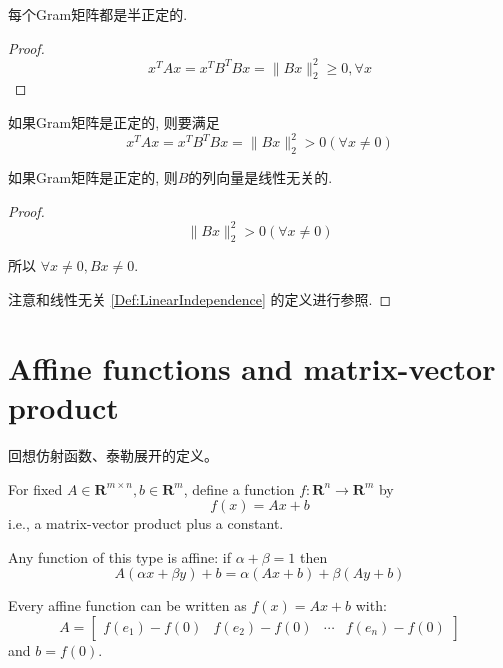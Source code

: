 \begin{theorem}
    每个Gram矩阵都是半正定的.
\end{theorem}

\begin{proof}
    $$ x^{T} A x=x^{T} B^{T} B x=\|B x\|_{2}^{2} \geq 0 , \forall x $$
\end{proof}

\begin{theorem}
    如果Gram矩阵是正定的, 则要满足
    $$ x^{T} A x=x^{T} B^{T} B x=\|B x\|_{2}^{2}>0 ( \forall x \neq 0) $$
\end{theorem}

\begin{corollary}
    如果Gram矩阵是正定的, 则$B$的列向量是线性无关的.
\end{corollary}

\begin{proof}
    $$\|B x\|_{2}^{2}>0 ( \forall x \neq 0)$$

所以 $\forall x \neq 0, Bx \neq 0  $.

    注意和线性无关 \ref{Def:LinearIndependence} 的定义进行参照.
\end{proof}

\section{Affine functions and matrix-vector product}


回想仿射函数、泰勒展开的定义。

For fixed $ A \in \mathbf{R}^{m \times n}, b \in \mathbf{R}^{m} $, define a function $ f: \mathbf{R}^{n} \rightarrow \mathbf{R}^{m} $ by
$$
f(x)=A x+b
$$
i.e., a matrix-vector product plus a constant.

Any function of this type is affine: if $ \alpha+\beta=1 $ then
$$
A(\alpha x+\beta y)+b=\alpha(A x+b)+\beta(A y+b)
$$

Every affine function can be written as $ f(x)=A x+b $ with:
$$
A=\left[\begin{array}{llll}
f\left(e_{1}\right)-f(0) & f\left(e_{2}\right)-f(0) & \cdots & f\left(e_{n}\right)-f(0)
\end{array}\right]
$$
and $ b=f(0) $.


